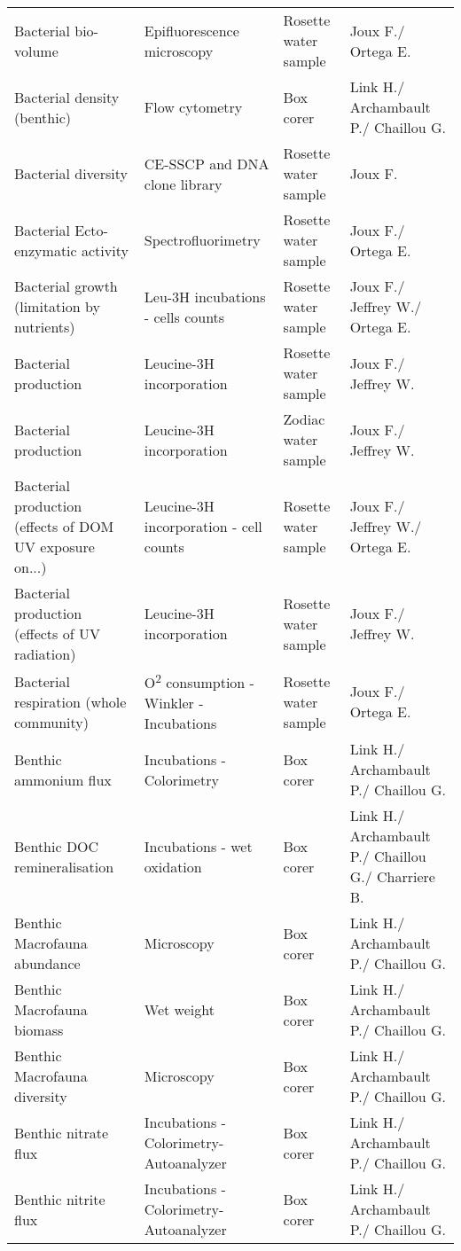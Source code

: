 \begin{longtable}[t]{llll}
\addlinespace
Bacterial bio-volume & Epifluorescence microscopy & Rosette water sample & Joux F./ Ortega E.\\
Bacterial density (benthic) & Flow cytometry & Box corer & Link H./ Archambault P./ Chaillou G.\\
Bacterial diversity & CE-SSCP and DNA clone library & Rosette water sample & Joux F.\\
Bacterial Ecto-enzymatic activity & Spectrofluorimetry & Rosette water sample & Joux F./ Ortega E.\\
Bacterial growth (limitation by nutrients) & Leu-3H incubations - cells counts & Rosette water sample & Joux F./ Jeffrey W./ Ortega E.\\
\addlinespace
Bacterial production & Leucine-3H incorporation & Rosette water sample & Joux F./ Jeffrey W.\\
Bacterial production & Leucine-3H incorporation & Zodiac water sample & Joux F./ Jeffrey W.\\
Bacterial production (effects of DOM UV exposure on...) & Leucine-3H incorporation - cell counts & Rosette water sample & Joux F./ Jeffrey W./ Ortega E.\\
Bacterial production (effects of UV radiation) & Leucine-3H incorporation & Rosette water sample & Joux F./ Jeffrey W.\\
Bacterial respiration (whole community) & O\textsuperscript{2} consumption - Winkler - Incubations & Rosette water sample & Joux F./ Ortega E.\\
\addlinespace
Benthic ammonium flux & Incubations - Colorimetry & Box corer & Link H./ Archambault P./ Chaillou G.\\
Benthic DOC remineralisation & Incubations - wet oxidation & Box corer & Link H./ Archambault P./ Chaillou G./ Charriere B.\\
Benthic Macrofauna abundance & Microscopy & Box corer & Link H./ Archambault P./ Chaillou G.\\
Benthic Macrofauna biomass & Wet weight & Box corer & Link H./ Archambault P./ Chaillou G.\\
Benthic Macrofauna diversity & Microscopy & Box corer & Link H./ Archambault P./ Chaillou G.\\
\addlinespace
Benthic nitrate flux & Incubations - Colorimetry- Autoanalyzer & Box corer & Link H./ Archambault P./ Chaillou G.\\
Benthic nitrite flux & Incubations - Colorimetry- Autoanalyzer & Box corer & Link H./ Archambault P./ Chaillou G.\\

\end{longtable}
